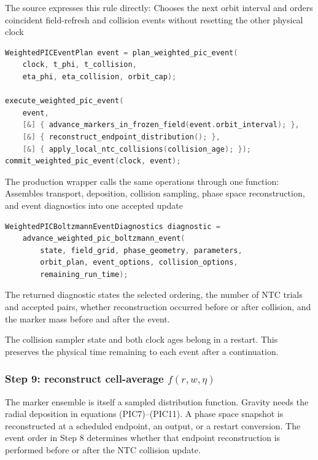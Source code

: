 The source expresses this rule directly:
{}
{Chooses the next orbit interval and orders coincident field-refresh and
 collision events without resetting the other physical clock}
\begin{lstlisting}[language=C++]
WeightedPICEventPlan event = plan_weighted_pic_event(
    clock, t_phi, t_collision,
    eta_phi, eta_collision, orbit_cap);

execute_weighted_pic_event(
    event,
    [&] { advance_markers_in_frozen_field(event.orbit_interval); },
    [&] { reconstruct_endpoint_distribution(); },
    [&] { apply_local_ntc_collisions(collision_age); });
commit_weighted_pic_event(clock, event);
\end{lstlisting}

The production wrapper calls the same operations through one function:
{}
{Assembles transport, deposition, collision sampling, phase space
 reconstruction, and event diagnostics into one accepted update}
\begin{lstlisting}[language=C++]
WeightedPICBoltzmannEventDiagnostics diagnostic =
    advance_weighted_pic_boltzmann_event(
        state, field_grid, phase_geometry, parameters,
        orbit_plan, event_options, collision_options,
        remaining_run_time);
\end{lstlisting}
The returned diagnostic states the selected ordering, the number of NTC
trials and accepted pairs, whether reconstruction occurred before or after
collision, and the marker mass before and after the event.

The collision sampler state and both clock ages belong in a restart.  This
preserves the physical time remaining to each event after a continuation.

\subsubsection{\texorpdfstring{Step 9: reconstruct cell-average \(f(r,w,\eta)\)}
{Step 9: reconstruct cell-average f(r,w,eta)}}

The marker ensemble is itself a sampled distribution function.  Gravity needs
the radial deposition in equations (PIC7)--(PIC11).  A phase space snapshot is
reconstructed at a scheduled endpoint, an output, or a restart conversion.
The event order in Step 8 determines whether that endpoint reconstruction is
performed before or after the NTC collision update.

